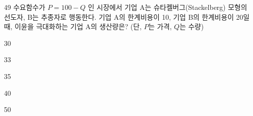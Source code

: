 \begin{question}{49}
수요함수가 $P=100-Q$ 인 시장에서 기업 A는 슈타켈버그(Stackelberg) 모형의 선도자, B는 추종자로 행동한다. 기업 A의 한계비용이 10, 기업 B의 한계비용이 20일 때, 이윤을 극대화하는 기업 A의 생산량은? (단, $P$는 가격, $Q$는 수량)
\begin{choices}
  \item 30
  \item 33
  \item 35
  \item 40
  \item 50
\end{choices}
\end{question}
